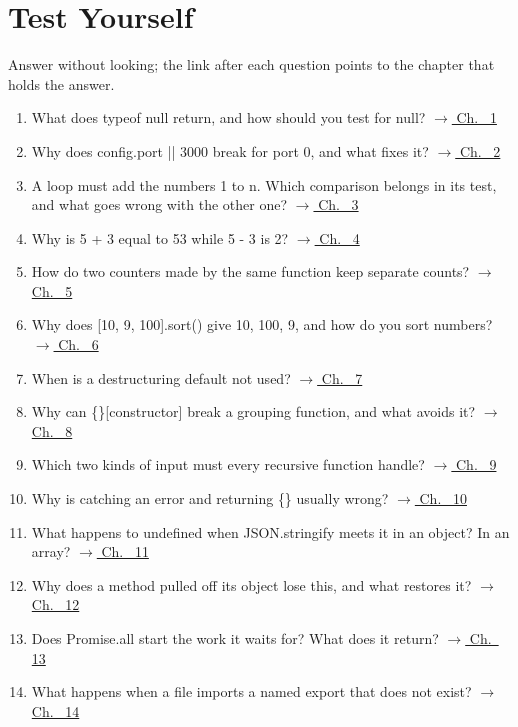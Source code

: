 \documentclass[10pt]{article}
\newcommand{\code}[1]{{\ttfamily\small #1}}
\begin{document}
\section*{Test Yourself}
Answer without looking; the link after each question points to the chapter that holds the answer.
\begin{enumerate}[leftmargin=1.6em,itemsep=3pt]
\item What does \code{typeof null} return, and how should you test for \code{null}? \hfill{\small\hyperref[ch:c01]{$\rightarrow$ Ch.~ 1}}
\item Why does \code{config.port || 3000} break for port 0, and what fixes it? \hfill{\small\hyperref[ch:c02]{$\rightarrow$ Ch.~ 2}}
\item A loop must add the numbers 1 to n. Which comparison belongs in its test, and what goes wrong with the other one? \hfill{\small\hyperref[ch:c03]{$\rightarrow$ Ch.~ 3}}
\item Why is \code{\textquotedbl{}5\textquotedbl{} + 3} equal to \code{\textquotedbl{}53\textquotedbl{}} while \code{\textquotedbl{}5\textquotedbl{} - 3} is \code{2}? \hfill{\small\hyperref[ch:c04]{$\rightarrow$ Ch.~ 4}}
\item How do two counters made by the same function keep separate counts? \hfill{\small\hyperref[ch:c05]{$\rightarrow$ Ch.~ 5}}
\item Why does \code{[10, 9, 100].sort()} give 10, 100, 9, and how do you sort numbers? \hfill{\small\hyperref[ch:c06]{$\rightarrow$ Ch.~ 6}}
\item When is a destructuring default not used? \hfill{\small\hyperref[ch:c07]{$\rightarrow$ Ch.~ 7}}
\item Why can \code{\{\}[\textquotedbl{}constructor\textquotedbl{}]} break a grouping function, and what avoids it? \hfill{\small\hyperref[ch:c08]{$\rightarrow$ Ch.~ 8}}
\item Which two kinds of input must every recursive function handle? \hfill{\small\hyperref[ch:c09]{$\rightarrow$ Ch.~ 9}}
\item Why is catching an error and returning \code{\{\}} usually wrong? \hfill{\small\hyperref[ch:c10]{$\rightarrow$ Ch.~ 10}}
\item What happens to \code{undefined} when \code{JSON.stringify} meets it in an object? In an array? \hfill{\small\hyperref[ch:c11]{$\rightarrow$ Ch.~ 11}}
\item Why does a method pulled off its object lose \code{this}, and what restores it? \hfill{\small\hyperref[ch:c12]{$\rightarrow$ Ch.~ 12}}
\item Does \code{Promise.all} start the work it waits for? What does it return? \hfill{\small\hyperref[ch:c13]{$\rightarrow$ Ch.~ 13}}
\item What happens when a file imports a named export that does not exist? \hfill{\small\hyperref[ch:c14]{$\rightarrow$ Ch.~ 14}}
\end{enumerate}
\end{document}

